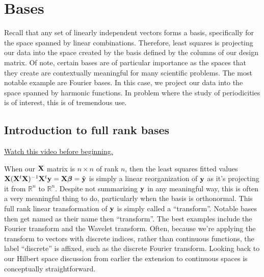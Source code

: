 \chapter{Bases}


Recall that any set of linearly independent vectors forms a basis,
specifically for the space spanned by linear combinations. Therefore,
least squares is projecting our data into the space created by
the basis defined by the columns of our design matrix. Of note,
certain bases are of particular importance as the spaces that
they create are contextually meaningful for many scientific
problems. The most notable example are Fourier bases. In this
case, we project our data into the space spanned by harmonic
functions. In problem where the study of periodicities is 
of interest, this is of tremendous use.

\section{Introduction to full rank bases}

\href{https://www.youtube.com/watch?v=vsm9AY6YN-Q&index=32&list=PLpl-gQkQivXhdgUCdaUQcdb31CRe8Mm2y}{Watch this video before beginning.}

When our $\mathbf{X}$ matrix is $n\times n$ of rank $n$, then the least squares
fitted values $\mathbf{X} (\mathbf{X}^t \mathbf{X})^{-1} \mathbf{X}^t \mathbf{y} = \mathbf{X} \boldsymbol{\beta} = \hat {\mathbf{y}}$ is simply a linear reorganization
of $\mathbf{y}$ as it's projecting it from $\mathbb{R}^n$ to $\mathbb{R}^n$. 
Despite not summarizing $\mathbf{y}$ in any meaningful way, this is often
a very meaningful thing to do, particularly when the basis is orthonormal.
This full rank linear transformation of $\mathbf{y}$ is simply called a 
``transform''. Notable bases then get named as their name then ``transform''. 
The best examples include the Fourier transform and the Wavelet transform.
Often, because we're applying the transform to vectors with discrete
indices, rather than continuous functions, the label ``discrete'' is
affixed, such as the discrete Fourier transform. Looking back to
our Hilbert space discussion from earlier the extension to continuous
spaces is conceptually straightforward. 

